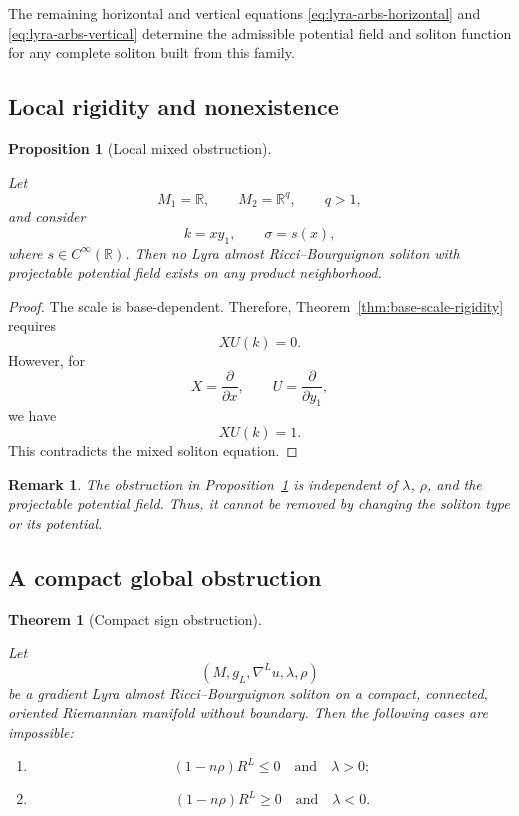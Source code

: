 \documentclass[a4paper,11pt]{article}
\theoremstyle{plain}
\newtheorem{theorem}{Theorem}[section]
\newtheorem{proposition}{Proposition}[section]
\newtheorem{remark}{Remark}[section]
\numberwithin{equation}{section}
\begin{document}
The remaining horizontal and vertical equations
\eqref{eq:lyra-arbs-horizontal} and
\eqref{eq:lyra-arbs-vertical} determine the admissible potential
field and soliton function for any complete soliton built from this
family.

\subsection{Local rigidity and nonexistence}
\label{subsec:local-rigidity-nonexistence}

\begin{proposition}[Local mixed obstruction]
	\label{prop:local-mixed-obstruction}
	
	Let
	\[
	M_{1}=\mathbb R,
	\qquad
	M_{2}=\mathbb R^{q},
	\qquad
	q>1,
	\]
	and consider
	\begin{equation}
		k=xy_{1},
		\qquad
		\sigma=s(x),
		\label{eq:local-obstruction-data}
	\end{equation}
	where \(s\in C^{\infty}(\mathbb R)\). Then no Lyra almost
	Ricci--Bourguignon soliton with projectable potential field
	exists on any product neighborhood.
\end{proposition}

\begin{proof}
	The scale is base-dependent. Therefore,
	Theorem~\ref{thm:base-scale-rigidity} requires
	\[
	XU(k)=0.
	\]
	However, for
	\[
	X=\frac{\partial}{\partial x},
	\qquad
	U=\frac{\partial}{\partial y_{1}},
	\]
	we have
	\[
	XU(k)=1.
	\]
	This contradicts the mixed soliton equation.
\end{proof}

\begin{remark}
	The obstruction in
	Proposition~\ref{prop:local-mixed-obstruction} is independent
	of \(\lambda\), \(\rho\), and the projectable potential field.
	Thus, it cannot be removed by changing the soliton type or its
	potential.
\end{remark}

\subsection{A compact global obstruction}
\label{subsec:compact-global-obstruction}

\begin{theorem}[Compact sign obstruction]
	\label{thm:compact-sign-obstruction}
	
	Let
	\[
	\left(
	M,g_{L},\nabla^{L}u,\lambda,\rho
	\right)
	\]
	be a gradient Lyra almost Ricci--Bourguignon soliton on a
	compact, connected, oriented Riemannian manifold without
	boundary. Then the following cases are impossible:
	\begin{enumerate}
		\item
		\[
		(1-n\rho)R^{L}\leq0
		\quad\text{and}\quad
		\lambda>0;
		\]
		\item
		\[
		(1-n\rho)R^{L}\geq0
		\quad\text{and}\quad
		\lambda<0.
		\]
	\end{enumerate}
\end{theorem}
\end{document}

